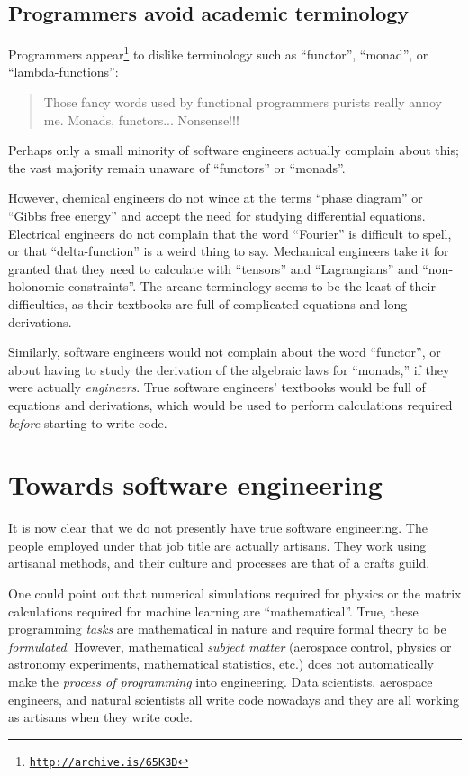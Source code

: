 \subsection{Programmers avoid academic terminology }

Programmers appear\footnote{\texttt{\href{http://archive.is/65K3D}{http://archive.is/65K3D}}}
to dislike terminology such as ``functor'', ``monad'', or ``lambda-functions'':
\begin{quote}
{\small{}Those fancy words used by functional programmers purists
really annoy me. Monads, functors... Nonsense!!! }{\small\par}
\end{quote}
Perhaps only a small minority of software engineers actually complain
about this; the vast majority remain unaware of ``functors'' or
``monads''.

However, chemical engineers do not wince at the terms ``phase diagram''
or ``Gibbs free energy'' and accept the need for studying differential
equations. Electrical engineers do not complain that the word ``Fourier''
is difficult to spell, or that ``delta-function'' is a weird thing
to say. Mechanical engineers take it for granted that they need to
calculate with ``tensors'' and ``Lagrangians'' and ``non-holonomic
constraints''. The arcane terminology seems to be the least of their
difficulties, as their textbooks are full of complicated equations
and long derivations.

Similarly, software engineers would not complain about the word ``functor'',
or about having to study the derivation of the algebraic laws for
``monads,'' \textendash{} if they were actually \emph{engineers}.
True software engineers' textbooks would be full of equations and
derivations, which would be used to perform calculations required
\emph{before} starting to write code.

\section{Towards software engineering }

It is now clear that we do not presently have true software engineering.
The people employed under that job title are actually artisans. They
work using artisanal methods, and their culture and processes are
that of a crafts guild.

One could point out that numerical simulations required for physics
or the matrix calculations required for machine learning are ``mathematical''.
True, these programming \emph{tasks} are mathematical in nature and
require formal theory to be \emph{formulated}. However, mathematical
\emph{subject matter} (aerospace control, physics or astronomy experiments,
mathematical statistics, etc.) does not automatically make the \emph{process
of programming} into engineering. Data scientists, aerospace engineers,
and natural scientists all write code nowadays \textendash{} and they
are all working as artisans when they write code.


